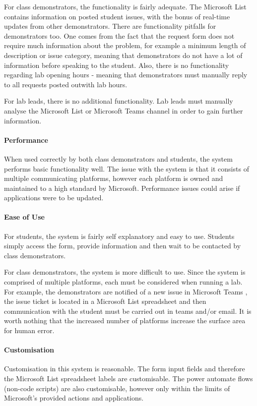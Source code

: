 For class demonstrators, the functionality is fairly adequate. The Microsoft List contains information on posted student issues, with the bonus of real-time updates from other demonstrators. There are functionality pitfalls for demonstrators too. One comes from the fact that the request form does not require much information about the problem, for example a minimum length of description or issue category, meaning that demonstrators do not have a lot of information before speaking to the student. Also, there is no functionality regarding lab opening hours - meaning that demonstrators must manually reply to all requests posted outwith lab hours.

For lab leads, there is no additional functionality. Lab leads must manually analyse the Microsoft List or Microsoft Teams \cite{teams} channel in order to gain further information. 

\paragraph{Performance}  
When used correctly by both class demonstrators and students, the system performs basic functionality well. The issue with the system is that it consists of multiple communicating platforms, however each platform is owned and maintained to a high standard by Microsoft. Performance issues could arise if applications were to be updated.

\paragraph{Ease of Use} 
For students, the system is fairly self explanatory and easy to use. Students simply access the form, provide information and then wait to be contacted by class demonstrators.

For class demonstrators, the system is more difficult to use. Since the system is comprised of multiple platforms, each must be considered when running a lab. For example, the demonstrators are notified of a new issue in Microsoft Teams \cite{teams}, the issue ticket is located in a Microsoft List spreadsheet and then communication with the student must be carried out in teams and/or email. It is worth nothing that the increased number of platforms increase the surface area for human error.


\paragraph{Customisation} 
Customisation in this system is reasonable. The form input fields and therefore the Microsoft List spreadsheet labels are customisable. The power automate \cite{pauto} flows (non-code scripts) are also customisable, however only within the limits of Microsoft's provided actions and applications.


